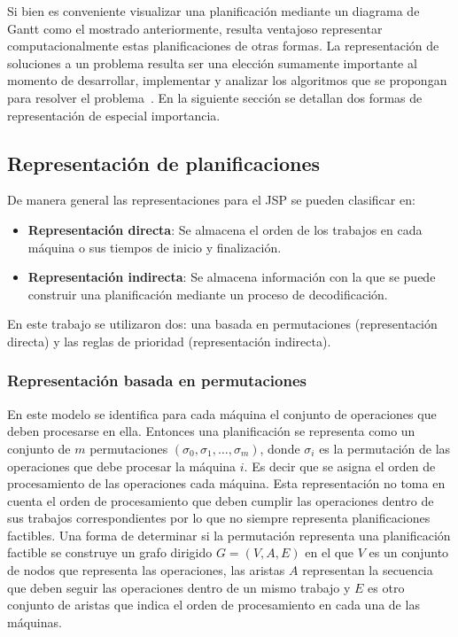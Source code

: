 Si bien es conveniente visualizar una planificación mediante un diagrama de Gantt como el mostrado anteriormente, resulta ventajoso representar computacionalmente 
estas planificaciones de otras formas. 
%
La representación de soluciones a un problema resulta ser una elección sumamente importante al momento de desarrollar, implementar y analizar los algoritmos que se 
propongan para resolver el problema~\cite{rothlauf2002representations}. 
%
En la siguiente sección se detallan dos formas de representación de especial importancia.

\subsection{Representación de planificaciones}
De manera general las representaciones para el JSP se pueden clasificar en\cite{Cheng1996}:
\begin{itemize}
    \item \textbf{Representación directa}: Se almacena el orden de los trabajos en cada máquina o sus tiempos de inicio y finalización.
    \item \textbf{Representación indirecta}: Se almacena información con la que se puede construir una planificación mediante un proceso de decodificación.
\end{itemize}

En este trabajo se utilizaron dos: una basada en permutaciones (representación directa) y las reglas de prioridad (representación indirecta).

\subsubsection*{Representación basada en permutaciones} 
En este modelo se identifica para cada máquina el conjunto de operaciones que deben procesarse en ella. Entonces una planificación se representa como un conjunto de $m$ permutaciones $(\sigma_0,\sigma_1,\dots,\sigma_m)$, donde $\sigma_i$ es la permutación de las operaciones que debe procesar la máquina $i$. Es decir que se asigna el orden de procesamiento de las operaciones cada máquina.
%
Esta representación no toma en cuenta el orden de procesamiento que deben cumplir las operaciones dentro de sus trabajos correspondientes por lo que no siempre representa planificaciones factibles.
%
Una forma de determinar si la permutación representa una planificación factible se construye un grafo dirigido $G=(V,A,E)$ en el que $V$ es un conjunto de nodos que representa las operaciones, las aristas $A$ representan la secuencia que deben seguir las operaciones dentro de un mismo trabajo y $E$ es otro conjunto de aristas que indica el orden de procesamiento en cada una de las máquinas. 

